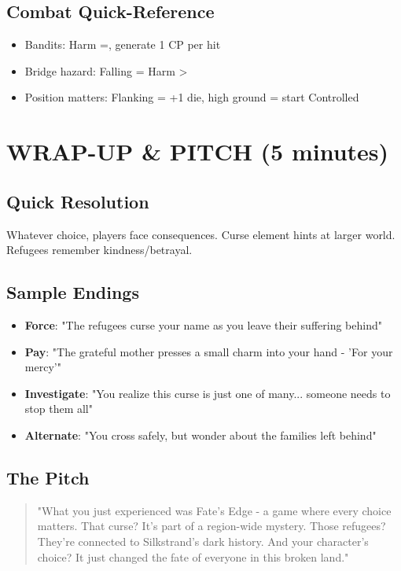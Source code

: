 \documentclass[12pt]{article}
\begin{document}
\subsection*{Combat Quick-Reference}
\begin{itemize}
\item Bandits: Harm =, generate 1 CP per hit
\item Bridge hazard: Falling = Harm >
\item Position matters: Flanking = +1 die, high ground = start Controlled
\end{itemize}

\section{WRAP-UP \& PITCH (5 minutes)}

\subsection*{Quick Resolution}
Whatever choice, players face consequences. Curse element hints at larger world. Refugees remember kindness/betrayal.

\subsection*{Sample Endings}
\begin{itemize}
\item \textbf{Force}: "The refugees curse your name as you leave their suffering behind"
\item \textbf{Pay}: "The grateful mother presses a small charm into your hand - 'For your mercy'"
\item \textbf{Investigate}: "You realize this curse is just one of many... someone needs to stop them all"
\item \textbf{Alternate}: "You cross safely, but wonder about the families left behind"
\end{itemize}

\subsection*{The Pitch}
\begin{quote}
"What you just experienced was Fate's Edge - a game where every choice matters. That curse? It's part of a region-wide mystery. Those refugees? They're connected to Silkstrand's dark history. And your character's choice? It just changed the fate of everyone in this broken land."
\end{quote}
\end{document}
